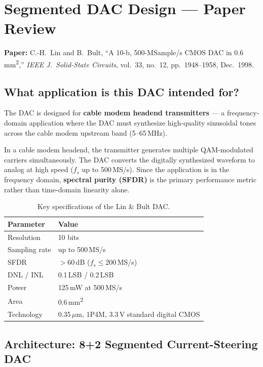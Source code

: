 \documentclass{article}
\begin{document}
\section{Segmented DAC Design --- Paper Review}

\textbf{Paper:} C.-H.~Lin and B.~Bult, ``A 10-b, 500-MSample/s CMOS DAC in 0.6\,mm\textsuperscript{2},'' \textit{IEEE J.\ Solid-State Circuits}, vol.~33, no.~12, pp.~1948--1958, Dec.~1998.

\subsection{What application is this DAC intended for?}

The DAC is designed for \textbf{cable modem headend transmitters} --- a frequency-domain application where the DAC must synthesize high-quality sinusoidal tones across the cable modem upstream band (5--65\,MHz).

In a cable modem headend, the transmitter generates multiple QAM-modulated carriers simultaneously. The DAC converts the digitally synthesized waveform to analog at high speed ($f_s$ up to 500\,MS/s). Since the application is in the frequency domain, \textbf{spectral purity (SFDR)} is the primary performance metric rather than time-domain linearity alone.

\begin{table}[H]
\centering
\caption{Key specifications of the Lin \& Bult DAC.}
\begin{tabular}{@{}ll@{}}
\toprule
Parameter & Value \\
\midrule
Resolution    & 10 bits \\
Sampling rate & up to 500\,MS/s \\
SFDR          & $>60$\,dB ($f_s \leq 200$\,MS/s) \\
DNL / INL     & 0.1\,LSB / 0.2\,LSB \\
Power         & 125\,mW at 500\,MS/s \\
Area          & 0.6\,mm\textsuperscript{2} \\
Technology    & 0.35\,$\mu$m, 1P4M, 3.3\,V standard digital CMOS \\
\bottomrule
\end{tabular}
\end{table}

\subsection{Architecture: 8+2 Segmented Current-Steering DAC}
\end{document}

